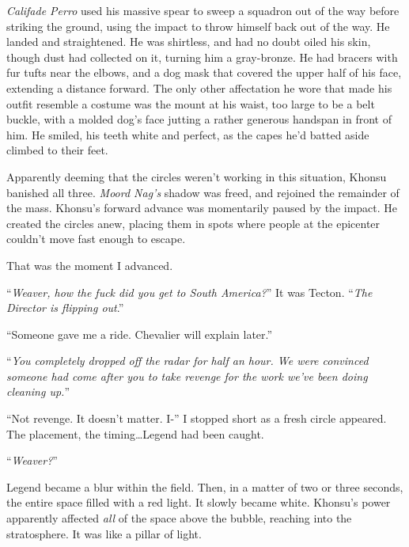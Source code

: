 \emph{Califa}\emph{de Perro }used his massive spear to sweep a squadron out of the way before striking the ground, using the impact to throw himself back out of the way.  He landed and straightened.  He was shirtless, and had no doubt oiled his skin, though dust had collected on it, turning him a gray-bronze.  He had bracers with fur tufts near the elbows, and a dog mask that covered the upper half of his face, extending a distance forward.  The only other affectation he wore that made his outfit resemble a costume was the mount at his waist, too large to be a belt buckle, with a molded dog's face jutting a rather generous handspan in front of him.  He smiled, his teeth white and perfect, as the capes he'd batted aside climbed to their feet.



Apparently deeming that the circles weren't working in this situation, Khonsu banished all three.  \emph{Moord Nag's} shadow was freed, and rejoined the remainder of the mass.  Khonsu's forward advance was momentarily paused by the impact.  He created the circles anew, placing them in spots where people at the epicenter couldn't move fast enough to escape.



That was the moment I advanced.



``\emph{Weaver, how the fuck did you get to South America?}''  It was Tecton.  ``\emph{The Director is flipping out}.''



``Someone gave me a ride.  Chevalier will explain later.''



``\emph{You completely dropped off the radar for half an hour.  We were convinced someone had come after you to take revenge for the work we've been doing cleaning up.}''



``Not revenge.  It doesn't matter.  I-'' I stopped short as a fresh circle appeared.  The placement, the timing\ldots Legend had been caught.



``\emph{Weaver?}''



Legend became a blur within the field.  Then, in a matter of two or three seconds, the entire space filled with a red light.  It slowly became white.  Khonsu's power apparently affected \emph{all} of the space above the bubble, reaching into the stratosphere.  It was like a pillar of light.



